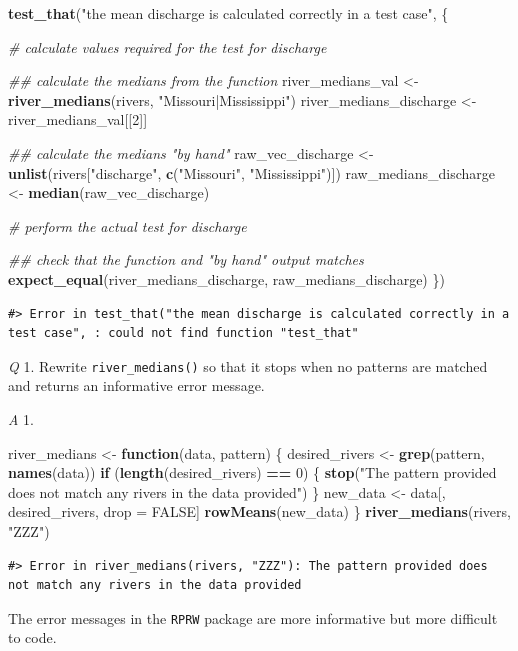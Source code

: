 \documentclass[
]{book}
\newenvironment{Shaded}{\begin{snugshade}}{\end{snugshade}}
\newcommand{\CommentTok}[1]{\textcolor[rgb]{0.56,0.35,0.01}{\textit{#1}}}
\newcommand{\ControlFlowTok}[1]{\textcolor[rgb]{0.13,0.29,0.53}{\textbf{#1}}}
\newcommand{\DecValTok}[1]{\textcolor[rgb]{0.00,0.00,0.81}{#1}}
\newcommand{\KeywordTok}[1]{\textcolor[rgb]{0.13,0.29,0.53}{\textbf{#1}}}
\newcommand{\NormalTok}[1]{#1}
\newcommand{\OperatorTok}[1]{\textcolor[rgb]{0.81,0.36,0.00}{\textbf{#1}}}
\newcommand{\OtherTok}[1]{\textcolor[rgb]{0.56,0.35,0.01}{#1}}
\newcommand{\StringTok}[1]{\textcolor[rgb]{0.31,0.60,0.02}{#1}}
\begin{document}
\begin{Shaded}
\begin{Highlighting}[]
\KeywordTok{test_that}\NormalTok{(}\StringTok{"the mean discharge is calculated correctly in a test case"}\NormalTok{, \{}
  
  \CommentTok{# calculate values required for the test for discharge}

  \CommentTok{## calculate the medians from the function}
\NormalTok{  river_medians_val <-}\StringTok{ }\KeywordTok{river_medians}\NormalTok{(rivers, }\StringTok{"Missouri|Mississippi"}\NormalTok{)}
\NormalTok{  river_medians_discharge <-}\StringTok{ }\NormalTok{river_medians_val[[}\DecValTok{2}\NormalTok{]]}

  \CommentTok{## calculate the medians "by hand"}
\NormalTok{  raw_vec_discharge <-}\StringTok{ }\KeywordTok{unlist}\NormalTok{(rivers[}\StringTok{"discharge"}\NormalTok{, }\KeywordTok{c}\NormalTok{(}\StringTok{"Missouri"}\NormalTok{, }\StringTok{"Mississippi"}\NormalTok{)])}
\NormalTok{  raw_medians_discharge <-}\StringTok{ }\KeywordTok{median}\NormalTok{(raw_vec_discharge)}
  
  \CommentTok{# perform the actual test for discharge}

  \CommentTok{## check that the function and "by hand" output matches}
  \KeywordTok{expect_equal}\NormalTok{(river_medians_discharge, raw_medians_discharge)}
\NormalTok{\})}
\end{Highlighting}
\end{Shaded}

\begin{verbatim}
#> Error in test_that("the mean discharge is calculated correctly in a test case", : could not find function "test_that"
\end{verbatim}

\emph{Q} 1. Rewrite \texttt{river\_medians()} so that it stops when no patterns are matched and returns an informative error message.

\emph{A} 1.

\begin{Shaded}
\begin{Highlighting}[]
\NormalTok{river_medians <-}\StringTok{ }\ControlFlowTok{function}\NormalTok{(data, pattern) \{}
\NormalTok{  desired_rivers <-}\StringTok{ }\KeywordTok{grep}\NormalTok{(pattern, }\KeywordTok{names}\NormalTok{(data))}
  \ControlFlowTok{if}\NormalTok{ (}\KeywordTok{length}\NormalTok{(desired_rivers) }\OperatorTok{==}\StringTok{ }\DecValTok{0}\NormalTok{) \{}
    \KeywordTok{stop}\NormalTok{(}\StringTok{"The pattern provided does not match any rivers in the data provided"}\NormalTok{)}
\NormalTok{  \}}
\NormalTok{  new_data <-}\StringTok{ }\NormalTok{data[, desired_rivers, drop =}\StringTok{ }\OtherTok{FALSE}\NormalTok{]}
  \KeywordTok{rowMeans}\NormalTok{(new_data)}
\NormalTok{\}}
\KeywordTok{river_medians}\NormalTok{(rivers, }\StringTok{"ZZZ"}\NormalTok{)}
\end{Highlighting}
\end{Shaded}

\begin{verbatim}
#> Error in river_medians(rivers, "ZZZ"): The pattern provided does not match any rivers in the data provided
\end{verbatim}

The error messages in the \texttt{RPRW} package are more informative but more difficult to code.

  
\end{document}
